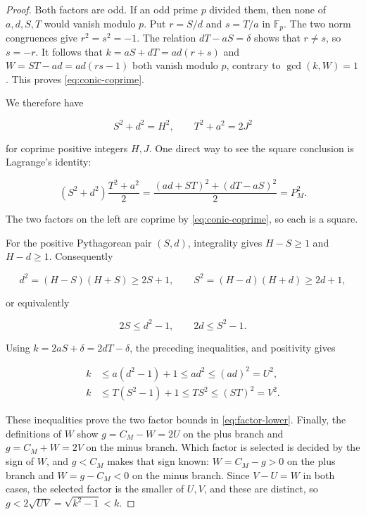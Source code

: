 \begin{proof}
Both factors are odd. If an odd prime $p$ divided them, then none of
$a,d,S,T$ would vanish modulo $p$. Put
$r=S/d$ and $s=T/a$ in $\mathbb{F}_p$. The two norm congruences give
$r^2=s^2=-1$. The relation $dT-aS=\delta$ shows that $r\ne s$, so
$s=-r$. It follows that
$k=aS+dT=ad(r+s)$ and $W=ST-ad=ad(rs-1)$ both vanish modulo $p$, contrary
to $\gcd(k,W)=1$. This proves \cref{eq:conic-coprime}.

We therefore have

\begin{equation}
 S^2+d^2=H^2,
 \qquad
 T^2+a^2=2J^2
 \label{eq:two-conics}
\end{equation}

for coprime positive integers $H,J$. One direct way to see the square
conclusion is Lagrange's identity:

\begin{equation}
 (S^2+d^2)\frac{T^2+a^2}{2}
 =\frac{(ad+ST)^2+(dT-aS)^2}{2}
 =P_M^2.
\end{equation}

The two factors on the left are coprime by \cref{eq:conic-coprime}, so each
is a square.

For the positive Pythagorean pair $(S,d)$, integrality gives
$H-S\geqslant1$ and $H-d\geqslant1$. Consequently

\begin{equation}
 d^2=(H-S)(H+S)\geqslant2S+1,
 \qquad
 S^2=(H-d)(H+d)\geqslant2d+1,
\end{equation}

or equivalently

\begin{equation}
 2S\leqslant d^2-1,
 \qquad
 2d\leqslant S^2-1.
\end{equation}

Using $k=2aS+\delta=2dT-\delta$, the preceding inequalities, and
positivity gives

\begin{align}
 k
 &\leqslant a(d^2-1)+1
 \leqslant ad^2
 \leqslant(ad)^2=U^2,
 \label{eq:U-lower}\\
 k
 &\leqslant T(S^2-1)+1
 \leqslant TS^2
 \leqslant(ST)^2=V^2.
 \label{eq:V-lower}
\end{align}

These inequalities prove the two factor bounds in
\cref{eq:factor-lower}. Finally, the
definitions of $W$ show $g=C_M-W=2U$ on the plus branch and
$g=C_M+W=2V$ on the minus branch. Which factor is selected is decided by
the sign of $W$, and $g<C_M$ makes that sign known: $W=C_M-g>0$ on the plus
branch and $W=g-C_M<0$ on the minus branch. Since $V-U=W$ in both cases,
the selected factor is the smaller of $U,V$, and these are distinct, so
$g<2\sqrt{UV}=\sqrt{k^2-1}<k$.
\end{proof}

